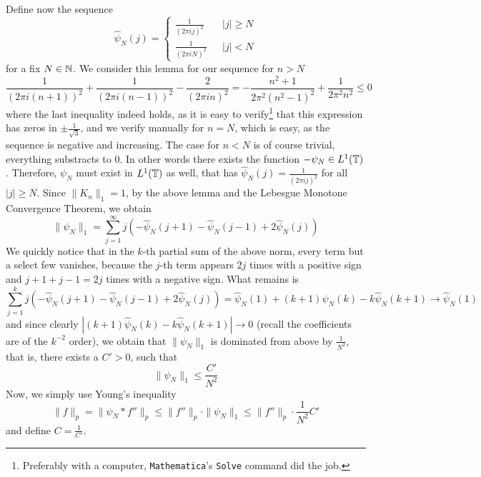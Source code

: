 \documentclass[a4paper, 12pt]{article}
\begin{document}
\begin{Exercise}
    Define now the sequence
    \[
        \hat\psi_N(j) =
        \begin{cases}
            \frac{1}{(2\pi i j)^2} \quad & |j| \geq N \\
            \frac{1}{(2\pi i N)^2} & |j| < N
        \end{cases}
    \]
    for a fix $N \in \mathbb{N}$.
    We consider this lemma for our sequence for $n > N$
    \[
        \frac{1}{(2\pi i (n+1))^2} + \frac{1}{(2\pi i (n-1))^2} - \frac{2}{(2\pi i n)^2}
        = - \frac{n^2 + 1}{2\pi^2(n^2-1)^2} + \frac{1}{2\pi^2 n^2} \leq 0
    \]
    where the last inequality indeed holds, as it is easy to
    verify\footnote{Preferably with a computer, \texttt{Mathematica}'s
    \texttt{Solve} command did the job.} that this expression has zeros in
    $\pm\frac{1}{\sqrt{3}}$, and we verify manually for $n = N$, which is easy,
    as the sequence is negative and increasing.  The case for $n < N$ is of
    course trivial, everything substracts to $0$.  In other words there exists
    the function $-\psi_N \in L^1(\mathbb{T})$.  Therefore, $\psi_N$ must exist in
    $L^1(\mathbb{T})$ as well, that has $\hat\psi_N(j) = \frac{1}{(2\pi i j)^2}$ for
    all $|j| \geq N$.  Since $\| K_n \|_1 = 1$, by the above lemma and the
    Lebesgue Monotone Convergence Theorem, we obtain
    \[
        \| \psi_N \|_1 = \sum_{j = 1}^{\infty} j \left( -\hat\psi_N(j+1) - \hat\psi_N(j-1) + 2\hat\psi_N(j) \right)
    \]
    We quickly notice that in the $k$-th partial sum of the above norm, every term but a select few vanishes,
    because the $j$-th term appears $2j$ times with a positive sign and $j + 1 + j - 1 = 2j$ times with a negative sign.
    What remains is
    \[
        \sum_{j = 1}^{k} j \left( -\hat\psi_N(j+1) - \hat\psi_N(j-1) + 2\hat\psi_N(j) \right)
        = \hat\psi_N(1) + (k + 1)\hat\psi_N(k) - k\hat\psi_N(k+1) \to \hat\psi_N(1)
    \]
    and since clearly $|(k+1)\hat\psi_N(k) - k\hat\psi_N(k+1)| \to 0$ (recall the
    coefficients are of the $k^{-2}$ order), we obtain that $\|\psi_N\|_1$ is
    dominated from above by $\frac{1}{N^2}$, that is, there exists a $C' > 0$,
    such that
    \[
        \|\psi_N\|_1 \leq \frac{C'}{N^2}
    \]
    Now, we simply use Young's inequality
    \[
        \| f \|_p
        = \| \psi_N * f'' \|_p
        \leq \| f'' \|_p \cdot \| \psi_N \|_1
        \leq \| f'' \|_p \cdot \frac{1}{N^2} C'
    \]
    and define $C = \frac{1}{C'}$.
\end{Exercise}


\end{document}
